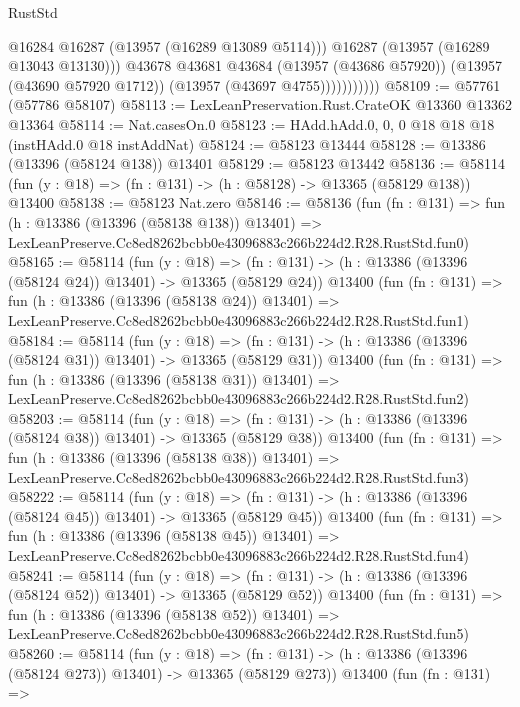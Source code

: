 \begin{lexlean}{RustStd}
\begin{coremodule}
                          @16284
                          @16287
                          (@13957 (@16289 @13089 @5114)))
                        @16287
                        (@13957 (@16289 @13043 @13130)))
                      @43678
                      @43681
                      @43684
                      (@13957 (@43686 @57920))
                      (@13957 (@43690 @57920 @1712))
                      (@13957 (@43697 @4755)))))))))))
@58109 := @57761 (@57786 @58107)
@58113 := LexLeanPreservation.Rust.CrateOK @13360 @13362 @13364
@58114 := Nat.casesOn.{0}
@58123 := HAdd.hAdd.{0, 0, 0} @18 @18 @18 (instHAdd.{0} @18 instAddNat)
@58124 := @58123 @13444
@58128 := @13386 (@13396 (@58124 @138)) @13401
@58129 := @58123 @13442
@58136 := @58114 (fun (y : @18) => (fn : @131) -> (h : @58128) -> @13365 (@58129 @138)) @13400
@58138 := @58123 Nat.zero
@58146 := @58136
    (fun (fn : @131) =>
    fun (h : @13386 (@13396 (@58138 @138)) @13401) =>
    LexLeanPreserve.Cc8ed8262bcbb0e43096883c266b224d2.R28.RustStd.fun0)
@58165 := @58114
    (fun (y : @18) =>
    (fn : @131) -> (h : @13386 (@13396 (@58124 @24)) @13401) -> @13365 (@58129 @24))
    @13400
    (fun (fn : @131) =>
    fun (h : @13386 (@13396 (@58138 @24)) @13401) =>
    LexLeanPreserve.Cc8ed8262bcbb0e43096883c266b224d2.R28.RustStd.fun1)
@58184 := @58114
    (fun (y : @18) =>
    (fn : @131) -> (h : @13386 (@13396 (@58124 @31)) @13401) -> @13365 (@58129 @31))
    @13400
    (fun (fn : @131) =>
    fun (h : @13386 (@13396 (@58138 @31)) @13401) =>
    LexLeanPreserve.Cc8ed8262bcbb0e43096883c266b224d2.R28.RustStd.fun2)
@58203 := @58114
    (fun (y : @18) =>
    (fn : @131) -> (h : @13386 (@13396 (@58124 @38)) @13401) -> @13365 (@58129 @38))
    @13400
    (fun (fn : @131) =>
    fun (h : @13386 (@13396 (@58138 @38)) @13401) =>
    LexLeanPreserve.Cc8ed8262bcbb0e43096883c266b224d2.R28.RustStd.fun3)
@58222 := @58114
    (fun (y : @18) =>
    (fn : @131) -> (h : @13386 (@13396 (@58124 @45)) @13401) -> @13365 (@58129 @45))
    @13400
    (fun (fn : @131) =>
    fun (h : @13386 (@13396 (@58138 @45)) @13401) =>
    LexLeanPreserve.Cc8ed8262bcbb0e43096883c266b224d2.R28.RustStd.fun4)
@58241 := @58114
    (fun (y : @18) =>
    (fn : @131) -> (h : @13386 (@13396 (@58124 @52)) @13401) -> @13365 (@58129 @52))
    @13400
    (fun (fn : @131) =>
    fun (h : @13386 (@13396 (@58138 @52)) @13401) =>
    LexLeanPreserve.Cc8ed8262bcbb0e43096883c266b224d2.R28.RustStd.fun5)
@58260 := @58114
    (fun (y : @18) =>
    (fn : @131) -> (h : @13386 (@13396 (@58124 @273)) @13401) -> @13365 (@58129 @273))
    @13400
    (fun (fn : @131) =>

\end{coremodule}
\end{lexlean}
